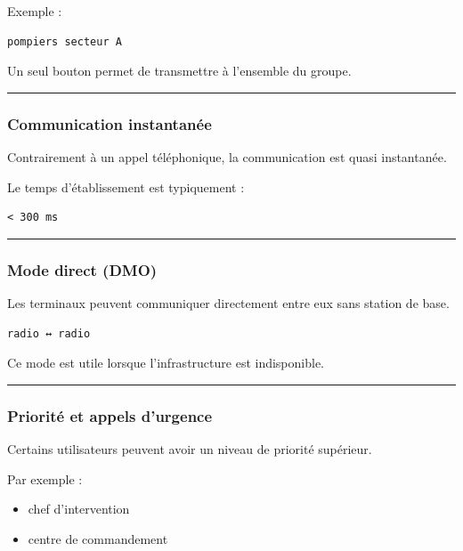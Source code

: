 \documentclass[
  french,
]{article}
\providecommand{\tightlist}{%
  \setlength{\itemsep}{0pt}\setlength{\parskip}{0pt}}
\begin{document}
Exemple :

\begin{verbatim}
pompiers secteur A
\end{verbatim}

Un seul bouton permet de transmettre à l'ensemble du groupe.

\begin{center}\rule{0.5\linewidth}{0.5pt}\end{center}

\subsubsection{Communication
instantanée}\label{communication-instantanuxe9e}

Contrairement à un appel téléphonique, la communication est quasi
instantanée.

Le temps d'établissement est typiquement :

\begin{verbatim}
< 300 ms
\end{verbatim}

\begin{center}\rule{0.5\linewidth}{0.5pt}\end{center}

\subsubsection{Mode direct (DMO)}\label{mode-direct-dmo}

Les terminaux peuvent communiquer directement entre eux sans station de
base.

\begin{verbatim}
radio ↔ radio
\end{verbatim}

Ce mode est utile lorsque l'infrastructure est indisponible.

\begin{center}\rule{0.5\linewidth}{0.5pt}\end{center}

\subsubsection{Priorité et appels
d'urgence}\label{priorituxe9-et-appels-durgence}

Certains utilisateurs peuvent avoir un niveau de priorité supérieur.

Par exemple :

\begin{itemize}
\tightlist
\item
  chef d'intervention
\item
  centre de commandement
\end{itemize}
\end{document}

